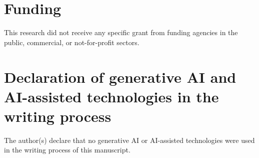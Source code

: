 \documentclass[preprint,12pt]{elsarticle}
\begin{document}
\section*{Funding}
This research did not receive any specific grant from funding agencies in the public, commercial, or not-for-profit sectors.

\section*{Declaration of generative AI and AI-assisted technologies in the writing process}
The author(s) declare that no generative AI or AI-assisted technologies were used in the writing process of this manuscript.

\end{document}
